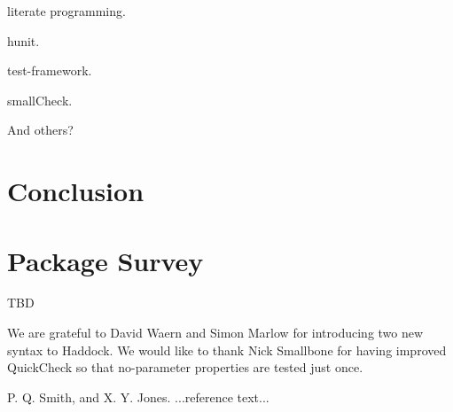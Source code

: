 \documentclass[preprint]{sigplanconf}
\begin{document}
literate programming.

hunit.

test-framework.

smallCheck.

And others?

\section{Conclusion}

\appendix

\section{Package Survey}

TBD

\acks

We are grateful to David Waern and Simon Marlow
for introducing two new syntax to Haddock.
We would like to thank
Nick Smallbone for having improved QuickCheck so that no-parameter properties are tested just once.






\begin{thebibliography}{}
\softraggedright

P. Q. Smith, and X. Y. Jones. ...reference text...

\end{thebibliography}
\end{document}
